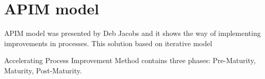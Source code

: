 \section{APIM model}


APIM model was presented by Deb Jacobs and it shows the way of implementing improvements in processes. This solution based on iterative model \cite{jacobs}

Accelerating Process Improvement Method contains three phases: Pre-Maturity, Maturity, Post-Maturity. 
